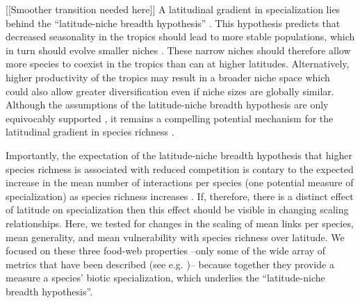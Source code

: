 \documentclass[12pt]{article}
\begin{document}
[[Smoother transition needed here]]
A latitudinal gradient in specialization lies behind the ``latitude-niche breadth hypothesis'' \citep{Vazquez2004}.
This hypothesis predicts that decreased seasonality in the tropics should lead to more stable populations, which in
turn should evolve smaller niches \citep{Vazquez2004}. These narrow niches should therefore allow more species to 
coexist in the tropics than can at higher latitudes. Alternatively, higher productivity of the tropics \citep{Brown2004}
may result in a broader niche space \citep{Davies2007} which could also allow greater diversification even if niche 
sizes are globally similar. Although the assumptions of the latitude-niche breadth hypothesis are only equivocably 
supported \citep{Vazquez2004}, it remains a compelling potential mechanism for the latitudinal gradient in species 
richness \citep{Lappalainen2006,Krasnov2008,Slove2010}. 


Importantly, the expectation of the latitude-niche breadth hypothesis that higher species richness is associated with 
reduced competition is contary to the expected increase in the mean number of interactions per species (one potential 
measure of specialization) as species richness increases \citep{Dunne2006,Riede2010}. If, therefore, there is a
distinct effect of latitude on specialization then this effect should be visible in changing scaling relationships.
Here, we tested for changes in the scaling of mean links per species, mean generality, and mean vulnerability with species
richness over latitude. We focused on these three food-web properties --only some of the wide array of metrics that have been
described (see e.g. \citep{})-- because together they provide a measure a species' biotic specialization, which underlies the 
``latitude-niche breadth hypothesis''.


\end{document}
